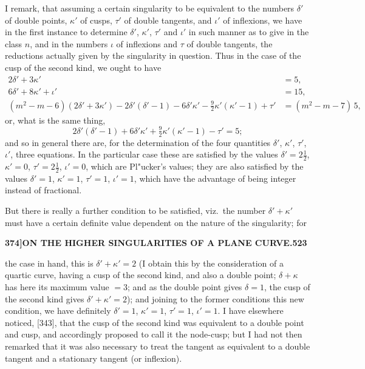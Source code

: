 \documentclass[11pt,a4paper]{article}
\begin{document}
I remark, that assuming a certain singularity to be equivalent to the numbers $\delta'$ of double points, $\kappa'$ of cusps, $\tau'$ of double tangents, and $\iota'$ of inflexions, we have in the first instance to determine $\delta'$, $\kappa'$, $\tau'$ and $\iota'$ in such manner as to give in the class $n$, and in the numbers $\iota$ of inflexions and $\tau$ of double tangents, the reductions actually given by the singularity in question. Thus in the case of the cusp of the second kind, we ought to have
\begin{align*}
2\delta' + 3\kappa' &= 5,\\
6\delta' + 8\kappa' + \iota' &= 15,\\
(m^{2} - m - 6)(2\delta' + 3\kappa') - 2\delta'(\delta' - 1) - 6\delta'\kappa' - \tfrac{9}{2}\kappa'(\kappa' - 1) + \tau' &= (m^{2} - m - 7)\,5,
\end{align*}
or, what is the same thing,
\[
2\delta'(\delta' - 1) + 6\delta'\kappa' + \tfrac{9}{2}\kappa'(\kappa' - 1) - \tau' = 5;
\]
and so in general there are, for the determination of the four quantities $\delta'$, $\kappa'$, $\tau'$, $\iota'$, three equations. In the particular case these are satisfied by the values $\delta' = 2\tfrac{1}{2}$, $\kappa' = 0$, $\tau' = 2\tfrac{1}{2}$, $\iota' = 0$, which are Pl"{u}cker's values; they are also satisfied by the values $\delta' = 1$, $\kappa' = 1$, $\tau' = 1$, $\iota' = 1$, which have the advantage of being integer instead of fractional.

But there is really a further condition to be satisfied, viz.~the number $\delta' + \kappa'$ must have a certain definite value dependent on the nature of the singularity; for

\newpage
\begin{flushright}
\textbf{374]\hspace{1em}ON THE HIGHER SINGULARITIES OF A PLANE CURVE.\hfill523}
\end{flushright}

\vspace{12pt}

\noindent
the case in hand, this is $\delta' + \kappa' = 2$ (I obtain this by the consideration of a quartic curve, having a cusp of the second kind, and also a double point; $\delta + \kappa$ has here its maximum value $= 3$; and as the double point gives $\delta = 1$, the cusp of the second kind gives $\delta' + \kappa' = 2$); and joining to the former conditions this new condition, we have definitely $\delta' = 1$, $\kappa' = 1$, $\tau' = 1$, $\iota' = 1$. I have elsewhere noticed, [343], that the cusp of the second kind was equivalent to a double point and cusp, and accordingly proposed to call it the node-cusp; but I had not then remarked that it was also necessary to treat the tangent as equivalent to a double tangent and a stationary tangent (or inflexion).
\end{document}
